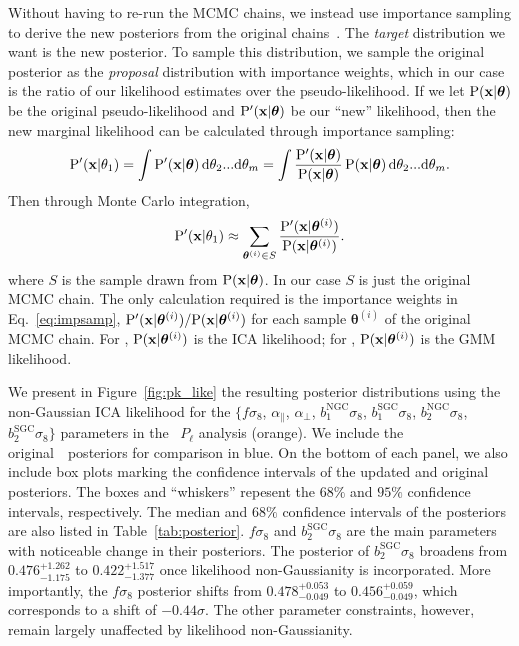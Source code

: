 \documentclass[12pt, letterpaper, preprint]{aastex}
\newcommand{\beq}{\begin{equation}}
\newcommand{\eeq}{\end{equation}}
\newcommand{\Beut}{\citetalias{beutler2017}}
\newcommand{\Sinh}{\citetalias{sinha2017}}
\begin{document}
Without having to re-run the MCMC chains, we instead use importance sampling 
to derive the new posteriors from the original chains~\citep[see][for details on importance sampling]{wasserman2004}. 
The \emph{target} distribution we want is the new posterior. To sample this 
distribution, we sample the original posterior as the \emph{proposal} 
distribution with importance weights, which in our case is the ratio 
of our likelihood estimates over the pseudo-likelihood. If we let 
$\mathrm{P}({\bf x} | \bm{\theta})$ be the original pseudo-likelihood and 
$\mathrm{P}'({\bf x} | \bm{\theta})$ be our ``new'' likelihood, then the new 
marginal likelihood can be calculated through importance sampling:   
\beq
\mathrm{P}'({\bf x} | \theta_1) = \int \mathrm{P}'({\bf x} | \bm{\theta})\,\mathrm{d}\theta_2...\mathrm{d}\theta_m = \int \frac{\mathrm{P}'({\bf x} | \bm{\theta})}{\mathrm{P}({\bf x} | \bm{\theta})}\, \mathrm{P}({\bf x} | \bm{\theta})\,\mathrm{d}\theta_2...\mathrm{d}\theta_m. \\
\eeq
Then through Monte Carlo integration, 
\beq
\mathrm{P}'({\bf x} | \theta_1) \approx \sum\limits_{\bm{\theta}^{(i)} \in S} \frac{\mathrm{P}'({\bf x} | \bm{\theta}^{(i)})}{\mathrm{P}({\bf x} | \bm{\theta}^{(i)})}. \label{eq:impsamp}
\eeq
where $S$ is the sample drawn from $\mathrm{P}({\bf x} | \bm{\theta})$. In our 
case $S$ is just the original MCMC chain. The only calculation required 
is the importance weights in Eq.~\ref{eq:impsamp}, 
${\mathrm{P}'({\bf x} | \bm{\theta}^{(i)})}/{\mathrm{P}({\bf x} | \bm{\theta}^{(i)})}$ for 
each sample $\bm{\theta}^{(i)}$ of the original MCMC chain. 
For \Beut, $\mathrm{P}({\bf x} | \bm{\theta}^{(i)})$ is the ICA likelihood;  
for \Sinh, $\mathrm{P}({\bf x} | \bm{\theta}^{(i)})$ is the GMM likelihood.

We present in Figure~\ref{fig:pk_like} the resulting posterior 
distributions using the non-Gaussian ICA likelihood for the 
$\big \{f \sigma_8$, $\alpha_\parallel$, $\alpha_\perp$, 
$b_1^\mathrm{NGC} \sigma_8$, $b_1^\mathrm{SGC} \sigma_8$, 
$b_2^\mathrm{NGC} \sigma_8$, $b_2^\mathrm{SGC} \sigma_8\big \}$
parameters in the \Beut~$P_\ell$ analysis (orange). We include 
the original~\Beut~posteriors for comparison in blue. On the 
bottom of each panel, we also include box plots marking the 
confidence intervals of the updated and original posteriors. 
The boxes and ``whiskers'' repesent the $68\%$ and $95\%$ 
confidence intervals, respectively. The median and $68\%$ 
confidence intervals of the posteriors are also listed in Table~\ref{tab:posterior}.
$f \sigma_8$ and $b_2^\mathrm{SGC} \sigma_8$ are the main parameters with 
noticeable change in their posteriors. The posterior of $b_2^\mathrm{SGC} \sigma_8$
broadens from $0.476^{+1.262}_{-1.175}$ to $0.422^{+1.517}_{-1.377}$ once likelihood 
non-Gaussianity is incorporated. More importantly, the $f \sigma_8$ posterior
shifts from $0.478^{+0.053}_{-0.049}$ to $0.456^{+0.059}_{-0.049}$, which 
corresponds to a shift of $-0.44 \sigma$. The other parameter constraints, 
however, remain largely unaffected by likelihood non-Gaussianity. 
\end{document}
